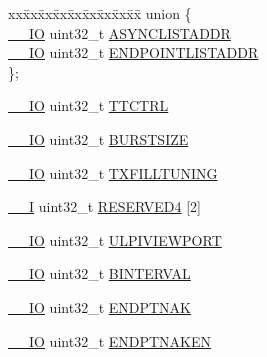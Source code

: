 \begin{DoxyCompactItemize}
\begin{tabbing}
\end{tabbing}\item 
\begin{tabbing}
xx\=xx\=xx\=xx\=xx\=xx\=xx\=xx\=xx\=\kill
union \{\\
\>\hyperlink{core__sc300_8h_aec43007d9998a0a0e01faede4133d6be}{\_\_IO} uint32\_t \hyperlink{struct_l_p_c___u_s_b_h_s___t_ae8e8b435efd599e7cb730809e3ba6dea}{ASYNCLISTADDR}\\
\>\hyperlink{core__sc300_8h_aec43007d9998a0a0e01faede4133d6be}{\_\_IO} uint32\_t \hyperlink{struct_l_p_c___u_s_b_h_s___t_a59d3d4b2c95485fdfd1aca397407cb9c}{ENDPOINTLISTADDR}\\
\}; \\

\end{tabbing}\item 
\hyperlink{core__sc300_8h_aec43007d9998a0a0e01faede4133d6be}{\+\_\+\+\_\+\+IO} uint32\+\_\+t \hyperlink{struct_l_p_c___u_s_b_h_s___t_a1c8a382a4d6ca96899df6d1979cd9637}{T\+T\+C\+T\+RL}
\item 
\hyperlink{core__sc300_8h_aec43007d9998a0a0e01faede4133d6be}{\+\_\+\+\_\+\+IO} uint32\+\_\+t \hyperlink{struct_l_p_c___u_s_b_h_s___t_a7d519a319a72374b4701099098ea8c9c}{B\+U\+R\+S\+T\+S\+I\+ZE}
\item 
\hyperlink{core__sc300_8h_aec43007d9998a0a0e01faede4133d6be}{\+\_\+\+\_\+\+IO} uint32\+\_\+t \hyperlink{struct_l_p_c___u_s_b_h_s___t_a3c352ffa30d3a84981a1dead4eca34fa}{T\+X\+F\+I\+L\+L\+T\+U\+N\+I\+NG}
\item 
\hyperlink{core__sc300_8h_af63697ed9952cc71e1225efe205f6cd3}{\+\_\+\+\_\+I} uint32\+\_\+t \hyperlink{struct_l_p_c___u_s_b_h_s___t_adcde36755ddc4fd76b5514815f2fb143}{R\+E\+S\+E\+R\+V\+E\+D4} \mbox{[}2\mbox{]}
\item 
\hyperlink{core__sc300_8h_aec43007d9998a0a0e01faede4133d6be}{\+\_\+\+\_\+\+IO} uint32\+\_\+t \hyperlink{struct_l_p_c___u_s_b_h_s___t_ac6b9be3c87326d058790a7e5c38c9f41}{U\+L\+P\+I\+V\+I\+E\+W\+P\+O\+RT}
\item 
\hyperlink{core__sc300_8h_aec43007d9998a0a0e01faede4133d6be}{\+\_\+\+\_\+\+IO} uint32\+\_\+t \hyperlink{struct_l_p_c___u_s_b_h_s___t_a1a34c86d05dddf89fae40a694b7dc8f1}{B\+I\+N\+T\+E\+R\+V\+AL}
\item 
\hyperlink{core__sc300_8h_aec43007d9998a0a0e01faede4133d6be}{\+\_\+\+\_\+\+IO} uint32\+\_\+t \hyperlink{struct_l_p_c___u_s_b_h_s___t_aad4a9fdd99ed4783645771045d0926cf}{E\+N\+D\+P\+T\+N\+AK}
\item 
\hyperlink{core__sc300_8h_aec43007d9998a0a0e01faede4133d6be}{\+\_\+\+\_\+\+IO} uint32\+\_\+t \hyperlink{struct_l_p_c___u_s_b_h_s___t_aa815df0960fe8c19f268c141d9a3a1a4}{E\+N\+D\+P\+T\+N\+A\+K\+EN}

\end{DoxyCompactItemize}
